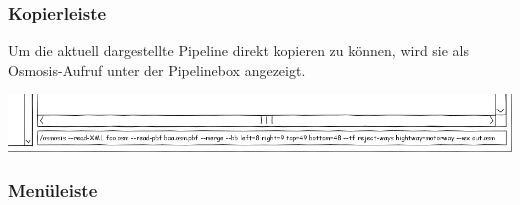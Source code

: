 \documentclass[a4paper,12pt]{scrartcl}
\begin{document}
\subsubsection{Kopierleiste}
Um die aktuell dargestellte Pipeline direkt kopieren zu können, wird sie als Osmosis-Aufruf unter der Pipelinebox angezeigt.
\begin{center}
\includegraphics[width=15cm]{ui_prototype/OsmUi_Leisteklein.png}
\end{center}

\subsubsection{Menüleiste}
\end{document}
